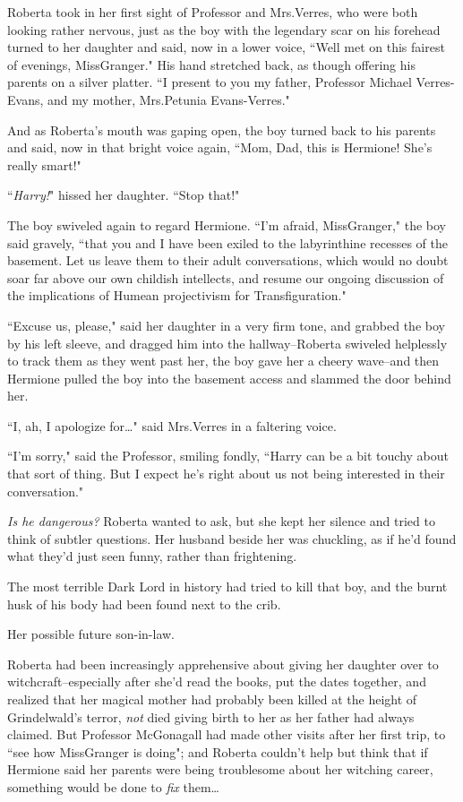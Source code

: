 Roberta took in her first sight of Professor and Mrs.\?Verres, who were both looking rather nervous, just as the boy with the legendary scar on his forehead turned to her daughter and said, now in a lower voice, ``Well met on this fairest of evenings, Miss\?Granger." His hand stretched back, as though offering his parents on a silver platter. ``I present to you my father, Professor Michael Verres-Evans, and my mother, Mrs.\?Petunia Evans-Verres."

And as Roberta's mouth was gaping open, the boy turned back to his parents and said, now in that bright voice again, ``Mom, Dad, this is Hermione! She's really smart!"

``\emph{Harry!}" hissed her daughter. ``Stop that!"

The boy swiveled again to regard Hermione. ``I'm afraid, Miss\?Granger," the boy said gravely, ``that you and I have been exiled to the labyrinthine recesses of the basement. Let us leave them to their adult conversations, which would no doubt soar far above our own childish intellects, and resume our ongoing discussion of the implications of Humean projectivism for Transfiguration."

``Excuse us, please," said her daughter in a very firm tone, and grabbed the boy by his left sleeve, and dragged him into the hallway\---Roberta swiveled helplessly to track them as they went past her, the boy gave her a cheery wave\---and then Hermione pulled the boy into the basement access and slammed the door behind her.

``I, ah, I apologize for{\ldots}" said Mrs.\?Verres in a faltering voice.

``I'm sorry," said the Professor, smiling fondly, ``Harry can be a bit touchy about that sort of thing. But I expect he's right about us not being interested in their conversation."

\emph{Is he dangerous?} Roberta wanted to ask, but she kept her silence and tried to think of subtler questions. Her husband beside her was chuckling, as if he'd found what they'd just seen funny, rather than frightening.

The most terrible Dark Lord in history had tried to kill that boy, and the burnt husk of his body had been found next to the crib.

Her possible future son-in-law.

Roberta had been increasingly apprehensive about giving her daughter over to witchcraft\---especially after she'd read the books, put the dates together, and realized that her magical mother had probably been killed at the height of Grindelwald's terror, \emph{not} died giving birth to her as her father had always claimed. But Professor McGonagall had made other visits after her first trip, to ``see how Miss\?Granger is doing"; and Roberta couldn't help but think that if Hermione said her parents were being troublesome about her witching career, something would be done to \emph{fix} them{\ldots}

